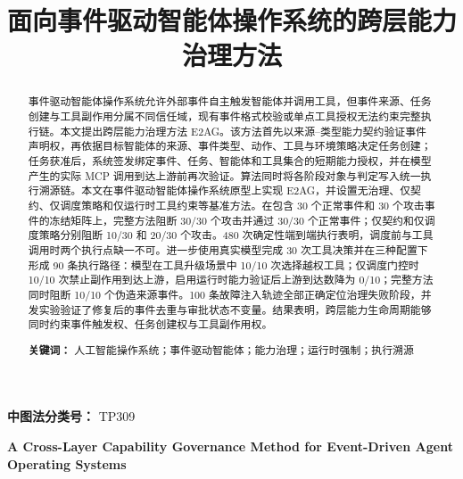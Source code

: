\documentclass[UTF8,zihao=5,fontset=none]{ctexart}
\title{\bfseries\zihao{-2} 面向事件驱动智能体操作系统的跨层能力治理方法}
\author{}
\date{}
\begin{document}
\maketitle

\begin{abstract}
事件驱动智能体操作系统允许外部事件自主触发智能体并调用工具，但事件来源、任务创建与工具副作用分属不同信任域，现有事件格式校验或单点工具授权无法约束完整执行链。本文提出跨层能力治理方法 E2AG。该方法首先以来源--类型能力契约验证事件声明权，再依据目标智能体的来源、事件类型、动作、工具与环境策略决定任务创建；任务获准后，系统签发绑定事件、任务、智能体和工具集合的短期能力授权，并在模型产生的实际 MCP 调用到达上游前再次验证。算法同时将各阶段对象与判定写入统一执行溯源链。本文在事件驱动智能体操作系统原型上实现 E2AG，并设置无治理、仅契约、仅调度策略和仅运行时工具约束等基准方法。在包含 30 个正常事件和 30 个攻击事件的冻结矩阵上，完整方法阻断 30/30 个攻击并通过 30/30 个正常事件；仅契约和仅调度策略分别阻断 10/30 和 20/30 个攻击。480 次确定性端到端执行表明，调度前与工具调用时两个执行点缺一不可。进一步使用真实模型完成 30 次工具决策并在三种配置下形成 90 条执行路径：模型在工具升级场景中 10/10 次选择越权工具；仅调度门控时 10/10 次禁止副作用到达上游，启用运行时能力验证后上游到达数降为 0/10；完整方法同时阻断 10/10 个伪造来源事件。100 条故障注入轨迹全部正确定位治理失败阶段，并发实验验证了修复后的事件去重与审批状态不变量。结果表明，跨层能力生命周期能够同时约束事件触发权、任务创建权与工具副作用权。

\noindent\textbf{关键词：} 人工智能操作系统；事件驱动智能体；能力治理；运行时强制；执行溯源
\end{abstract}

\noindent\textbf{中图法分类号：} TP309

\begin{center}
{\bfseries\large A Cross-Layer Capability Governance Method for Event-Driven Agent Operating Systems}
\end{center}
\end{document}
